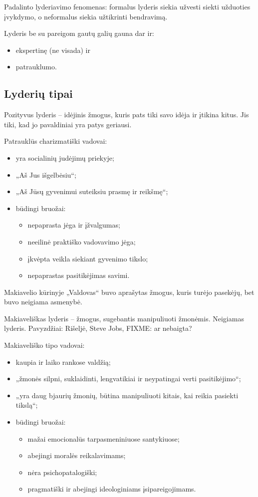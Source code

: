 Padalinto lyderiavimo fenomenas: formalus lyderis siekia užvesti siekti
užduoties įvykdymo, o neformalus siekia užtikrinti bendravimą.

Lyderis be su pareigom gautų galių gauna dar ir:
\begin{itemize}
  \item ekspertinę (ne visada) ir
  \item patrauklumo.
\end{itemize}

\subsection{Lyderių tipai}

Pozityvus lyderis – idėjinis žmogus, kuris pats tiki savo idėja ir įtikina
kitus. Jis tiki, kad jo pavaldiniai yra patys geriausi.

Patrauklūs charizmatiški vadovai:
\begin{itemize}
  \item yra socialinių judėjimų priekyje;
  \item „Aš Jus išgelbėsiu“;
  \item „Aš Jūsų gyvenimui suteiksiu prasmę ir reikšmę“;
  \item būdingi bruožai:
    \begin{itemize}
      \item nepaprasta jėga ir įžvalgumas;
      \item neeilinė praktiško vadovavimo jėga;
      \item įkvėpta veikla siekiant gyvenimo tikslo;
      \item nepaprastas pasitikėjimas savimi.
    \end{itemize}
\end{itemize}

Makiavelio kūrinyje „Valdovas“ buvo aprašytas žmogus, kuris turėjo
pasekėjų, bet buvo neigiama asmenybė.

Makiaveliškas lyderis – žmogus, sugebantis manipuliuoti žmonėmis.
Neigiamas lyderis. Pavyzdžiai: Rišeljė, Steve Jobs, FIXME: ar nebaigta?

Makiaveliško tipo vadovai:
\begin{itemize}
  \item kaupia ir laiko rankose valdžią;
  \item „žmonės silpni, suklaidinti, lengvatikiai ir neypatingai verti
    pasitikėjimo“;
  \item „yra daug bjaurių žmonių, būtina manipuliuoti kitais, kai reikia
    pasiekti tikslą“;
  \item būdingi bruožai:
    \begin{itemize}
      \item mažai emocionalūs tarpasmeniniuose santykiuose;
      \item abejingi moralės reikalavimams;
      \item nėra psichopatalogiški;
      \item pragmatiški ir abejingi ideologiniams įsipareigojimams.
    \end{itemize}
\end{itemize}

